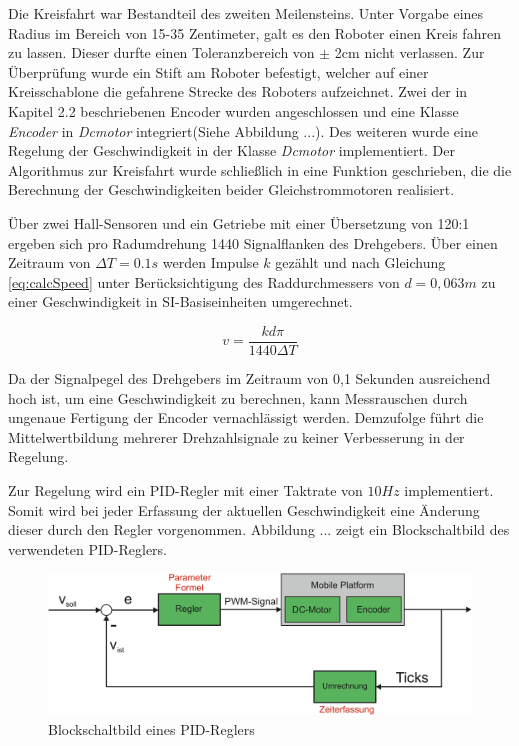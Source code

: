 \documentclass[12pt,a4paper,oneside]{article}
\begin{document}
\begin{spacing}{1.15}
Die Kreisfahrt war Bestandteil des zweiten Meilensteins. Unter Vorgabe eines Radius im Bereich von 15-35 Zentimeter, galt es den Roboter einen Kreis fahren zu lassen. Dieser durfte einen Toleranzbereich von $\pm$ 2cm nicht verlassen. Zur Überprüfung wurde ein Stift am Roboter befestigt, welcher auf einer Kreisschablone die gefahrene Strecke des Roboters aufzeichnet. Zwei der in Kapitel 2.2 beschriebenen Encoder wurden angeschlossen und eine Klasse \textit{Encoder} in \textit{Dcmotor} integriert(Siehe Abbildung ...). Des weiteren wurde eine Regelung der Geschwindigkeit in der Klasse \textit{Dcmotor} implementiert. Der Algorithmus zur Kreisfahrt wurde schließlich in eine Funktion geschrieben, die die Berechnung der Geschwindigkeiten beider Gleichstrommotoren realisiert. 

Über zwei Hall-Sensoren und ein Getriebe mit einer Übersetzung von 120:1 \cite{Dem13} ergeben sich pro Radumdrehung 1440 Signalflanken des Drehgebers. Über einen Zeitraum von $\Delta T = 0.1s$ werden Impulse $k$ gezählt und nach Gleichung \ref{eq:calcSpeed} unter Berücksichtigung des Raddurchmessers von $d = 0,063m$ zu einer Geschwindigkeit in SI-Basiseinheiten umgerechnet.

\begin{center}
\begin{equation}
v = \frac{k d \pi}{1440\Delta T}
\label{eq:calcSpeed}
\end{equation}
\end{center} 

Da der Signalpegel des Drehgebers im Zeitraum von 0,1 Sekunden ausreichend hoch ist, um eine Geschwindigkeit zu berechnen, kann Messrauschen durch ungenaue Fertigung der Encoder vernachlässigt werden. Demzufolge führt die Mittelwertbildung mehrerer Drehzahlsignale zu keiner Verbesserung in der Regelung.

Zur Regelung wird ein PID-Regler mit einer Taktrate von $10Hz$ implementiert. Somit wird bei jeder Erfassung der aktuellen Geschwindigkeit eine Änderung dieser durch den Regler vorgenommen. Abbildung ... zeigt ein Blockschaltbild des verwendeten PID-Reglers. 

\begin{figure}[!htb]
	\centering
	\includegraphics[scale=.5]{figs/PID_controller}
	\caption{Blockschaltbild eines PID-Reglers}
	\label{fig:PID_controller}
\end{figure}


\end{spacing}
\end{document}
